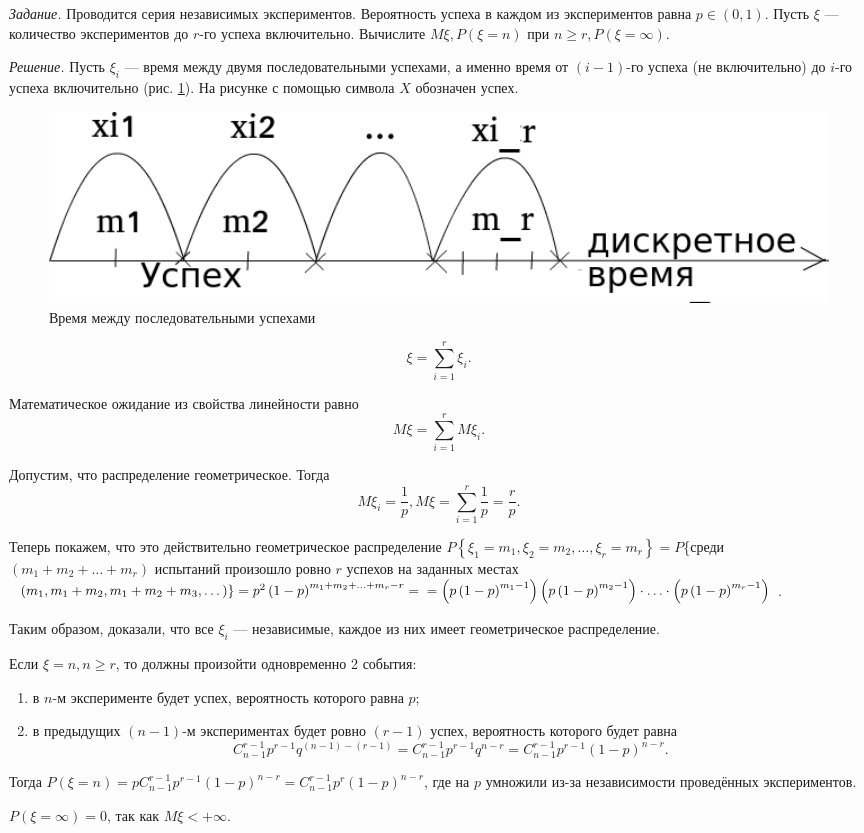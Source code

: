 \textit{Задание.} Проводится серия независимых экспериментов.
Вероятность успеха в каждом из экспериментов равна $p \in \left( 0, 1 \right) $.
Пусть $ \xi $ --- количество экспериментов до $r$-го успеха включительно.
Вычислите $M \xi, P \left( \xi = n \right) $ при $n \geq r, P \left( \xi = \infty \right) $.

\textit{Решение.}
Пусть $ \xi_i$ --- время между двумя последовательными успехами,
а именно время от $ \left( i-1 \right) $-го успеха (не включительно) до $i$-го успеха включительно (рис. \ref{fig:1217}).
На рисунке с помощью символа $X$ обозначен успех.

\begin{figure}[h!]
  \centering
  \includegraphics[width=1\textwidth]{./pictures/12_17.png}
  \caption{Время между последовательными успехами}
  \label{fig:1217}
\end{figure}

$$ \xi =
\sum \limits_{i=1}^r \xi_i.$$

Математическое ожидание из свойства линейности равно
$$M \xi =
\sum \limits_{i=1}^r M \xi_i.$$

Допустим, что распределение геометрическое.
Тогда
$$M \xi_i = \frac{1}{p},
M \xi = \sum \limits_{i=1}^r \frac{1}{p} = \frac{r}{p}.$$

Теперь покажем, что это действительно геометрическое распределение 
$P \left\{ \xi_1 = m_1, \xi_2 = m_2, \dotsc, \xi_r = m_r \right\} =
P$\{среди $ \left( m_1 + m_2 + \dotsc + m_r \right) $
испытаний произошло ровно $r$ успехов на заданных местах $ \\
\left. \left( m_1, m_1 + m_2, m_1 + m_2 + m_3, \dotsc \right) \right\} =
p^2 \left( 1-p \right)^{m_1 + m_2 + \dotsc + m_r - r} = \\
= \left( p \left( 1-p \right)^{m_1 - 1} \right) \left( p \left( 1 - p \right)^{m_2 - 1} \right) \cdot \dotsc \cdot
\left( p \left( 1 - p \right)^{m_r - 1} \right) $.

Таким образом, доказали, что все $ \xi_i$ --- независимые, каждое из них имеет геометрическое распределение.

Если $ \xi = n, n \geq r$, то должны произойти одновременно 2 события:
\begin{enumerate}
\item в $n$-м эксперименте будет успех, вероятность которого равна $p$;
\item в предыдущих $ \left( n-1 \right)$-м экспериментах будет ровно $ \left( r-1 \right) $ успех,
вероятность которого будет равна
$$C_{n-1}^{r-1} p^{r-1} q^{ \left( n-1 \right) - \left( r-1 \right) } =
C_{n-1}^{r-1} p^{r-1} q^{n-r} = C_{n-1}^{r-1} p^{r-1} \left( 1 - p \right)^{n-r}.$$
\end{enumerate}

Тогда $P \left( \xi = n \right) = pC_{n-1}^{r-1} p^{r-1} \left( 1-p \right)^{n-r} = C_{n-1}^{r-1} p^r \left( 1-p \right)^{n-r}$, где на $p$ умножили из-за независимости проведённых экспериментов.

$P \left( \xi = \infty \right) = 0$, так как $M \xi < + \infty $.
